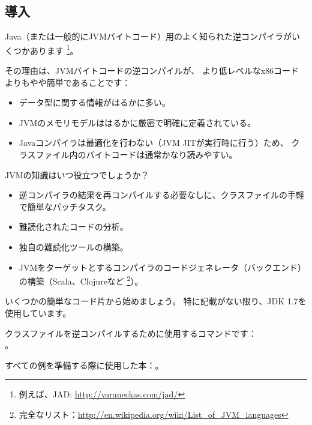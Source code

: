 \subsection{導入}

\newcommand{\JADURL}{\url{http://varaneckas.com/jad/}}

Java（または一般的に\ac{JVM}バイトコード）用のよく知られた逆コンパイラがいくつかあります
\footnote{例えば、JAD: \JADURL}。

その理由は、\ac{JVM}バイトコードの逆コンパイルが、
より低レベルなx86コードよりもやや簡単であることです：

\begin{itemize}
\item データ型に関する情報がはるかに多い。
\item \ac{JVM}のメモリモデルははるかに厳密で明確に定義されている。
\item Javaコンパイラは最適化を行わない（\ac{JVM} \ac{JIT}が実行時に行う）ため、
      クラスファイル内のバイトコードは通常かなり読みやすい。
      
\end{itemize}

\ac{JVM}の知識はいつ役立つでしょうか？

\newcommand{\URLListOfJVMLangs}{\url{http://en.wikipedia.org/wiki/List_of_JVM_languages}}

\begin{itemize}
\item 逆コンパイラの結果を再コンパイルする必要なしに、クラスファイルの手軽で簡単なパッチタスク。
\item 難読化されたコードの分析。
\item 独自の難読化ツールの構築。
\item \ac{JVM}をターゲットとするコンパイラのコードジェネレータ（バックエンド）の構築（Scala、Clojureなど
      \footnote{完全なリスト：\URLListOfJVMLangs}）。
      
\end{itemize}

いくつかの簡単なコード片から始めましょう。
特に記載がない限り、JDK 1.7を使用しています。

クラスファイルを逆コンパイルするために使用するコマンドです：\\
。

すべての例を準備する際に使用した本：\JavaBook。